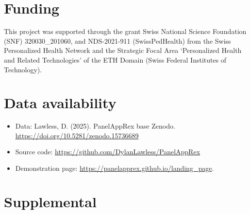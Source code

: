 \section*{Funding}
\noindent This project was supported through the grant Swiss National Science Foundation  (SNF) 320030\_201060, and NDS-2021-911 (SwissPedHealth) from the Swiss Personalized Health Network and the Strategic Focal Area `Personalized Health and Related Technologies' of the ETH Domain (Swiss Federal Institutes of Technology).

\section*{Data availability}
\begin{itemize}
\item Data: Lawless, D. (2025). PanelAppRex base Zenodo. \url{https://doi.org/10.5281/zenodo.15736689}
\item Source code: \url{https://github.com/DylanLawless/PanelAppRex}
\item Demonstration page: \url{https://panelapprex.github.io/landing_page}. 
\end{itemize}



\clearpage

\beginsupplement
\section{Supplemental} \label{Supplemental_text}

\begin{table}[htbp]
\caption{\textbf{Summary of case study queries and PanelAppRex results.} 
We recommend automated use that accounts for the union of all query results. For manual interface use, judgement-based panel selection is naturally expected. We therefore recorded the user-selected best-fit panel(s), defined as the returned panel or panels judged most clinically aligned with the pre-genetic case description and most likely to be prioritised by a user. In this context, broader but less specific panels (for example, ``COVID-19 research'' or ``Paediatric disorders'') may be deprioritised relative to panels whose title and scope more closely match the presenting condition. The results are summarised in \textbf{Figure \ref{fig:performance}}.
}
\label{tab:benchmark}
\end{table}

